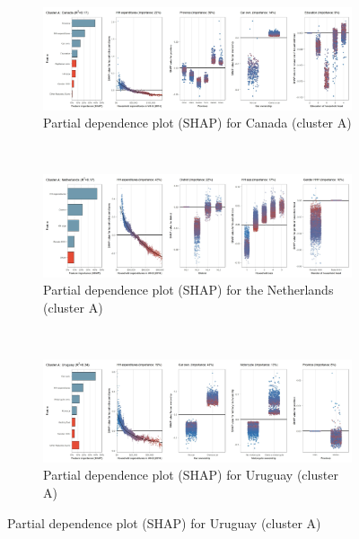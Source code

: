 \begin{figure}[ht!]\ContinuedFloat
    \centering
   \begin{subfigure}[b]{\textwidth}
         \centering
         \caption{Partial dependence plot (SHAP) for Canada (cluster A)}
         \label{fig:5b_CAN}
         \includegraphics[width=\textwidth]{Figure 5b/Figure_5b_CAN}         
     \end{subfigure}
    \\
    \vspace{0.5cm}
   \begin{subfigure}[b]{\textwidth}
         \centering
         \caption{Partial dependence plot (SHAP) for the Netherlands (cluster A)}
         \label{fig:5b_NLD}
         \includegraphics[width=\textwidth]{Figure 5b/Figure_5b_NLD}         
     \end{subfigure}
    \\
    \vspace{0.5cm}
   \begin{subfigure}[b]{\textwidth}
         \centering
         \caption{Partial dependence plot (SHAP) for Uruguay (cluster A)}
         \label{fig:5b_URY}
         \includegraphics[width=\textwidth]{Figure 5b/Figure_5b_URY}

\end{subfigure}
\end{figure}

